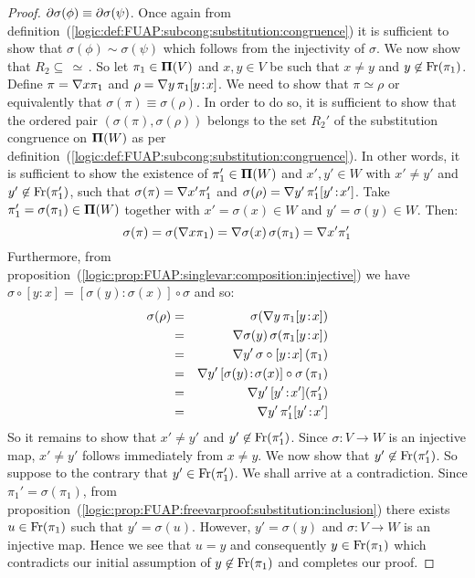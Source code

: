 \begin{proof}
$\mbox{$\partial$}\sigma(\phi)\equiv\mbox{$\partial$}\sigma(\psi)$. Once again from
definition~(\ref{logic:def:FUAP:subcong:substitution:congruence}) it
is sufficient to show that $\sigma(\phi)\sim\sigma(\psi)$ which
follows from the injectivity of $\sigma$. We now show that
$R_{2}\subseteq\,\simeq$\,. So let $\pi_{1}\in\mbox{${\bf\Pi}(V)$}$ and $x,y\in V$
be such that $x\neq y$ and $y\not\in\mbox{\rm Fr}(\pi_{1})$. Define
$\pi=\mbox{$\nabla$} x\pi_{1}$ and $\rho=\mbox{$\nabla$} y\,\pi_{1}[y\!:\!x]$. We need to
show that $\pi\simeq\rho$ or equivalently that
$\sigma(\pi)\equiv\sigma(\rho)$. In order to do so, it is sufficient
to show that the ordered pair $(\sigma(\pi),\sigma(\rho))$ belongs
to the set $R_{2}'$ of the substitution congruence on ${\bf\Pi}(W)$
as per
definition~(\ref{logic:def:FUAP:subcong:substitution:congruence}).
In other words, it is sufficient to show the existence of
$\pi_{1}'\in{\bf\Pi}(W)$ and $x',y'\in W$ with $x'\neq y'$ and
$y'\not\in\mbox{\rm Fr}(\pi_{1}')$, such that $\sigma(\pi)=\mbox{$\nabla$} x'\pi_{1}'$
and $\sigma(\rho)=\mbox{$\nabla$} y'\,\pi_{1}'[y'\!:\!x']$. Take
$\pi_{1}'=\sigma(\pi_{1})\in{\bf\Pi}(W)$ together with
$x'=\sigma(x)\in W$ and $y'=\sigma(y)\in W$. Then:
    \[
    \sigma(\pi)=\sigma(\mbox{$\nabla$} x\pi_{1})\\
        =\mbox{$\nabla$}\sigma(x)\,\sigma(\pi_{1})\\
        =\mbox{$\nabla$} x'\pi_{1}'
    \]
Furthermore, from
proposition~(\ref{logic:prop:FUAP:singlevar:composition:injective})
we have $\sigma\circ[y\!:\!x]=[\sigma(y)\!:\!\sigma(x)]\circ\sigma$
and so:
    \begin{eqnarray*}
    \sigma(\rho)&=&\sigma(\gen y\,\pi_{1}[y\!:\!x])\\
    &=&\gen\sigma(y)\,\sigma(\pi_{1}[y\!:\!x])\\
    &=&\gen y'\,\sigma\circ [y\!:\!x]\,(\pi_{1})\\
    &=&\gen y'\, [\sigma(y)\!:\!\sigma(x)]\circ\sigma\,(\pi_{1})\\
    &=&\gen y'\,[y'\!:\!x'](\pi_{1}')\\
    &=&\gen y'\,\pi_{1}'[y'\!:\!x']
    \end{eqnarray*}
So it remains to show that $x'\neq y'$ and
$y'\not\in\mbox{\rm Fr}(\pi_{1}')$. Since $\sigma:V\to W$ is an injective
map, $x'\neq y'$ follows immediately from $x\neq y$. We now show
that $y'\not\in\mbox{\rm Fr}(\pi_{1}')$. So suppose to the contrary that
$y'\in\mbox{\rm Fr}(\pi_{1}')$. We shall arrive at a contradiction. Since
$\pi_{1}'=\sigma(\pi_{1})$, from
proposition~(\ref{logic:prop:FUAP:freevarproof:substitution:inclusion})
there exists $u\in\mbox{\rm Fr}(\pi_{1})$ such that $y'=\sigma(u)$. However,
$y'=\sigma(y)$ and $\sigma:V\to W$ is an injective map. Hence we see
that $u=y$ and consequently $y\in\mbox{\rm Fr}(\pi_{1})$ which contradicts
our initial assumption of $y\not\in\mbox{\rm Fr}(\pi_{1})$ and completes our
proof.
\end{proof}


